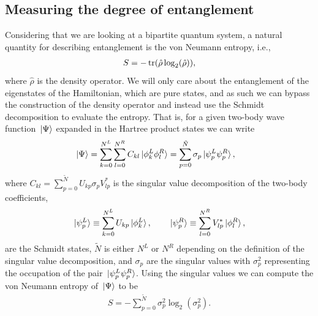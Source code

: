 \documentclass[twocolumn,superscriptaddress,unsortedaddress,
 amsmath,amssymb,
 aps,
]{revtex4-2}
\begin{document}
    \subsection{Measuring the degree of entanglement}
        Considering that we are looking at a bipartite
        quantum system, a natural quantity for
        describing entanglement is the von Neumann entropy,
        i.e.,
        \begin{align*}
            S
            = -\tr\!\qty(
                \hat{\rho}
                \log_2(\hat{\rho})
            ),
        \end{align*}
        where $\hat{\rho}$ is the density operator.
        We will only care about the entanglement of the
        eigenstates of the Hamiltonian, which are pure
        states, and as such we can bypass the construction
        of the density operator and instead use the Schmidt
        decomposition to evaluate the entropy.
        That is, for a given two-body wave function
        $\ket*{\Psi}$ expanded in the Hartree product states
        we can write
        \begin{align*}
            \ket*{\Psi}
            &= \sum_{k = 0}^{N^L}
            \sum_{l = 0}^{N^R}
            C_{kl}
            \ket*{\phi^L_k \phi^R_l}
            =
            \sum_{p = 0}^{\tilde{N}}
            \sigma_{p}
            \ket*{\psi^L_p \psi^R_p},
        \end{align*}
        where $C_{kl} = \sum_{p = 0}^{\tilde{N}} U_{kp}
        \sigma_{p} V^{*}_{lp}$ is the singular value
        decomposition of the two-body coefficients,
        \begin{gather*}
            \ket*{\psi^L_p}
            \equiv \sum_{k = 0}^{N^L}
            U_{kp} \ket*{\phi^L_k},
            \qquad
            \ket*{\psi^R_p}
            \equiv \sum_{l = 0}^{N^R}
            V^{*}_{lp} \ket*{\phi^R_l},
        \end{gather*}
        are the Schmidt states, $\tilde{N}$ is  either $N^L$
        or $N^R$ depending on the definition of the singular
        value decomposition, and $\sigma_p$ are the singular
        values with $\sigma_p^2$ representing the occupation
        of the pair $\ket*{\psi^L_p \psi^R_p}$.
        Using the singular values we can compute the von
        Neumann entropy of $\ket*{\Psi}$ to be
        \begin{align*}
            S = -\sum_{p = 0}^{\tilde{N}}
            \sigma_p^2 \log_2(\sigma_p^2).
        \end{align*}
\end{document}

